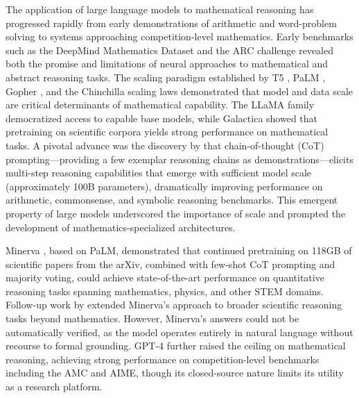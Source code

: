 \documentclass[11pt,a4paper]{article}
\begin{document}
The application of large language models to mathematical reasoning has progressed rapidly from early demonstrations of arithmetic and word-problem solving to systems approaching competition-level mathematics. Early benchmarks such as the DeepMind Mathematics Dataset \citep{saxton2019analysing} and the ARC challenge \citep{clark2018think} revealed both the promise and limitations of neural approaches to mathematical and abstract reasoning tasks. The scaling paradigm established by T5 \citep{raffel2020exploring}, PaLM \citep{chowdhery2023palm}, Gopher \citep{rae2022scaling}, and the Chinchilla scaling laws \citep{hoffmann2022training} demonstrated that model and data scale are critical determinants of mathematical capability. The LLaMA family \citep{touvron2023llama, touvron2023llama2} democratized access to capable base models, while Galactica \citep{taylor2022galactica} showed that pretraining on scientific corpora yields strong performance on mathematical tasks. A pivotal advance was the discovery by \cite{wei2022chain} that chain-of-thought (CoT) prompting---providing a few exemplar reasoning chains as demonstrations---elicits multi-step reasoning capabilities that emerge with sufficient model scale (approximately 100B parameters), dramatically improving performance on arithmetic, commonsense, and symbolic reasoning benchmarks. This emergent property of large models underscored the importance of scale and prompted the development of mathematics-specialized architectures.

Minerva \citep{lewkowycz2022minerva}, based on PaLM, demonstrated that continued pretraining on 118GB of scientific papers from the arXiv, combined with few-shot CoT prompting and majority voting, could achieve state-of-the-art performance on quantitative reasoning tasks spanning mathematics, physics, and other STEM domains. Follow-up work by \citet{lewkowycz2023beyond} extended Minerva's approach to broader scientific reasoning tasks beyond mathematics. However, Minerva's answers could not be automatically verified, as the model operates entirely in natural language without recourse to formal grounding. GPT-4 \citep{achiam2024gpt4} further raised the ceiling on mathematical reasoning, achieving strong performance on competition-level benchmarks including the AMC and AIME, though its closed-source nature limits its utility as a research platform.
\end{document}
